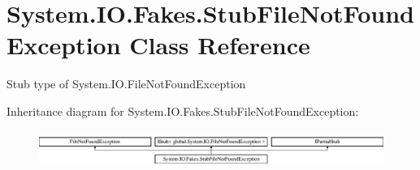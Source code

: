 \hypertarget{class_system_1_1_i_o_1_1_fakes_1_1_stub_file_not_found_exception}{\section{System.\-I\-O.\-Fakes.\-Stub\-File\-Not\-Found\-Exception Class Reference}
\label{class_system_1_1_i_o_1_1_fakes_1_1_stub_file_not_found_exception}
}


Stub type of System.\-I\-O.\-File\-Not\-Found\-Exception 


Inheritance diagram for System.\-I\-O.\-Fakes.\-Stub\-File\-Not\-Found\-Exception\-:\begin{figure}[H]
\begin{center}
\leavevmode
\includegraphics[height=1.236203cm]{class_system_1_1_i_o_1_1_fakes_1_1_stub_file_not_found_exception}
\end{center}
\end{figure}
